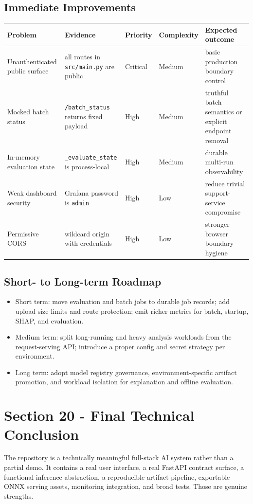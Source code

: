 \subsection{Immediate Improvements}
\begin{longtable}{@{}p{}p{}p{}p{}p{}@{}}
\toprule
\textbf{Problem} & \textbf{Evidence} & \textbf{Priority} & \textbf{Complexity} & \textbf{Expected outcome} \\
\midrule
\endhead
Unauthenticated public surface & all routes in \texttt{src/main.py} are public & Critical & Medium & basic production boundary control \\
Mocked batch status & \texttt{/batch\_status} returns fixed payload & High & Medium & truthful batch semantics or explicit endpoint removal \\
In-memory evaluation state & \texttt{\_evaluate\_state} is process-local & High & Medium & durable multi-run observability \\
Weak dashboard security & Grafana password is \texttt{admin} & High & Low & reduce trivial support-service compromise \\
Permissive CORS & wildcard origin with credentials & High & Low & stronger browser boundary hygiene \\
\bottomrule
\end{longtable}

\subsection{Short- to Long-term Roadmap}
\begin{itemize}[leftmargin=1.2em]
  \item Short term: move evaluation and batch jobs to durable job records; add upload size limits and route protection; emit richer metrics for batch, startup, SHAP, and evaluation.
  \item Medium term: split long-running and heavy analysis workloads from the request-serving API; introduce a proper config and secret strategy per environment.
  \item Long term: adopt model registry governance, environment-specific artifact promotion, and workload isolation for explanation and offline evaluation.
\end{itemize}

\section{Section 20 - Final Technical Conclusion}
The repository is a technically meaningful full-stack AI system rather than a partial demo. It contains a real user interface, a real FastAPI contract surface, a functional inference abstraction, a reproducible artifact pipeline, exportable ONNX serving assets, monitoring integration, and broad tests. Those are genuine strengths.

